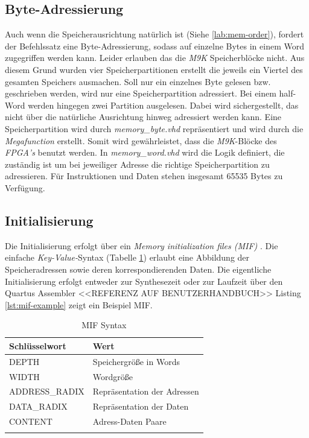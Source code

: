             
        \subsection{Byte-Adressierung}
            Auch wenn die Speicherausrichtung natürlich ist (Siehe \ref{lab:mem-order}), fordert der Befehlssatz eine Byte-Adressierung,
            sodass auf einzelne Bytes in einem Word zugegriffen werden kann. Leider erlauben das die \textit{M9K} Speicherblöcke nicht.
            Aus diesem Grund wurden vier Speicherpartitionen erstellt die jeweils ein Viertel des gesamten Speichers ausmachen.
            Soll nur ein einzelnes Byte gelesen bzw. geschrieben werden, wird nur eine Speicherpartition adressiert.
            Bei einem half-Word werden hingegen zwei Partition ausgelesen. Dabei wird sichergestellt,
            das nicht über die natürliche Ausrichtung hinweg adressiert werden kann.
            Eine Speicherpartition wird durch \textit{memory\_byte.vhd} repräsentiert und wird durch die \textit{Megafunction} erstellt.
            Somit wird gewährleistet, dass die \textit{M9K}-Blöcke des \textit{FPGA's} benutzt werden.
            In \textit{memory\_word.vhd} wird die Logik definiert, die zuständig ist um bei jeweiliger Adresse die 
            richtige Speicherpartition zu adressieren.
            Für Instruktionen und Daten stehen insgesamt 65535 Bytes zu Verfügung.

        \subsection{Initialisierung}\label{lab:mif}
            Die Initialisierung erfolgt über ein \textit{Memory initialization files (MIF)} \cite{intel-mif}.
            Die einfache \textit{Key-Value-}Syntax (Tabelle \ref{tab:mif-syntax}) erlaubt eine Abbildung der Speicheradressen sowie deren korrespondierenden Daten.
            Die eigentliche Initialisierung erfolgt entweder zur Synthesezeit oder zur Laufzeit über den Quartus Assembler <<REFERENZ AUF BENUTZERHANDBUCH>>
            Listing \ref{lst:mif-example} zeigt ein Beispiel MIF.
            \begin{center}
                \begin{longtable}{| l | l |}
                    \hline
                        Schlüsselwort & Wert\\
                    \hline
                        DEPTH & Speichergröße in Words\\
                    \hline
                        WIDTH & Wordgröße\\
                    \hline
                        ADDRESS\_RADIX & Repräsentation der Adressen\\
                    \hline
                        DATA\_RADIX & Repräsentation der Daten\\
                    \hline
                        CONTENT & Adress-Daten Paare\\
                    \hline
                    \caption[MIF Syntax]{MIF Syntax}
                    \label{tab:mif-syntax}
                \end{longtable}
            \end{center}

